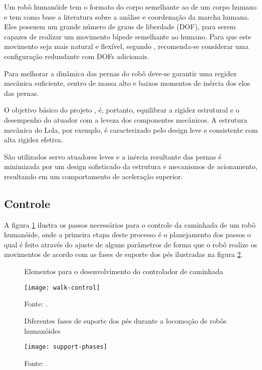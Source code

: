 Um robô humanóide tem o formato do corpo semelhante ao de um corpo humano e tem como base a literatura sobre a análise e coordenação da marcha humana. Eles possuem um grande número de graus de liberdade (DOF), para serem capazes de realizar um movimento bípede semelhante ao humano. Para que este movimento seja mais natural e flexível, segundo , recomenda-se considerar uma configuração redundante com DOFs adicionais.

Para melhorar a dinâmica das pernas do robô deve-se garantir uma regidez mecânica suficiente, centro de massa alto e baixos momentos de inércia dos elos das pernas.

O objetivo básico do projeto , é, portanto, equilibrar a rigidez estrutural e o desempenho do atuador com a leveza dos componentes mecânicos.
A estrutura mecânica do Lola, por exemplo, é caracterizado pelo design leve e consistente com alta rigidez efetiva.

São utilizados servo atuadores leves e a inércia resultante das pernas é minimizada por um design sofisticado da estrutura e mecanismos de acionamento, resultando em um comportamento de aceleração superior.

\subsection{Controle}
\label{ssec:control}

A figura \ref{fig:steps-control} ilustra os passos necessários para o controle da caminhada de um robô humanóide, onde a primeira etapa deste processo é o planejamento dos passos o qual é feito através do ajuste de alguns parâmetros de forma que o robô realize os movimentos de acordo com as fases de suporte dos pés ilustradas na figura \ref{fig:support-phases}.


\begin{figure} [H]
    \centering
    \caption{Elementos para o desenvolvimento do controlador de caminhada}
    \texttt{[image: walk-control]}
    \caption*{Fonte: \cite{Kashyap2021306}.}
    \label{fig:steps-control}
\end{figure}


\begin{figure} [H]
    \centering
    \caption{Diferentes fases de suporte dos pés durante a locomoção de robôs humanóides}
    \texttt{[image: support-phases]}
    \caption*{Fonte: \cite{Kashyap2021306}.}
    \label{fig:support-phases}
\end{figure}

